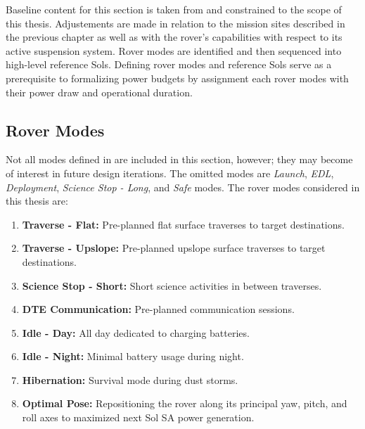 Baseline content for this section is taken from  and constrained to the scope of this thesis. Adjustements are made in relation to the mission sites described in the previous chapter as well as with the rover's capabilities with respect to its active suspension system. Rover modes are identified and then sequenced into high-level reference Sols. Defining rover modes and reference Sols serve as a prerequisite to formalizing power budgets by assignment each rover modes with their power draw and operational duration.


\subsection{Rover Modes}
\label{sec:ReferenceSols:RoverModes}
Not all modes defined in  are included in this section, however; they may become of interest in future design iterations. The omitted modes are \textit{Launch}, \textit{\ac{EDL}}, \textit{Deployment}, \textit{Science Stop - Long},  and \textit{Safe} modes. The rover modes considered in this thesis are:

\begin{enumerate}[label=\textcolor{BulletBlue}{(\alph*)}]
    \item \textbf{Traverse - Flat:} Pre-planned flat surface traverses to target destinations.
    \item \textbf{Traverse - Upslope:} Pre-planned upslope surface traverses to target destinations.
    \item \textbf{Science Stop - Short:} Short science activities in between traverses.
    \item \textbf{\ac{DTE} Communication:} Pre-planned communication sessions.
    \item \textbf{Idle - Day:} All day dedicated to charging batteries.
    \item \textbf{Idle - Night:} Minimal battery usage during night.
    \item \textbf{Hibernation:} Survival mode during dust storms.
    \item \textbf{Optimal Pose:} Repositioning the rover along its principal yaw, pitch, and roll axes to maximized next Sol \ac{SA} power generation.
\end{enumerate}

